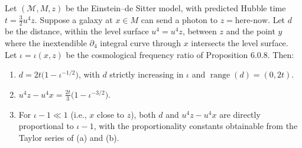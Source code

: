 Let $(\mathcal{M}, M, z)$ be the Einstein--de Sitter model, with predicted Hubble time $t = \frac{3}{2} u^4 z$. Suppose a galaxy at $x \in M$ can send a photon to $z = \text{here-now}$. Let $d$ be the distance, within the level surface $u^4 = u^4 z$, between $z$ and the point $y$ where the inextendible $\partial_4$ integral curve through $x$ intersects the level surface. Let $\iota = \iota(x, z)$ be the cosmological frequency ratio of Proposition 6.0.8. Then:

\begin{enumerate}
\item[(a)] $d = 2t\bigl(1 - \iota^{-1/2}\bigr)$, with $d$ strictly increasing in $\iota$ and $\operatorname{range}(d) = (0, 2t)$.
\item[(b)] $u^4 z - u^4 x = \frac{2t}{3}\bigl(1 - \iota^{-3/2}\bigr)$.
\item[(c)] For $\iota - 1 \ll 1$ (i.e., $x$ close to $z$), both $d$ and $u^4 z - u^4 x$ are directly proportional to $\iota - 1$, with the proportionality constants obtainable from the Taylor series of (a) and (b).
\end{enumerate}
